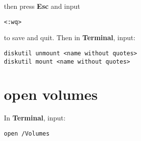 \documentclass[10pt,a4paper]{article}
\begin{document}
then press \textbf{Esc} and input 

\begin{lstlisting}
<:wq>
\end{lstlisting}

to save and quit.
Then in \textbf{Terminal}, input:

\begin{lstlisting}
diskutil unmount <name without quotes>
diskutil mount <name without quotes>
\end{lstlisting}

\section{open volumes}
In \textbf{Terminal}, input:
\begin{lstlisting}
open /Volumes
\end{lstlisting}
\end{document}

